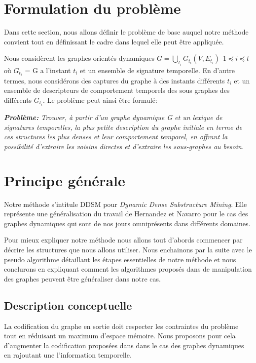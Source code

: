 \documentclass[a4paper,oneside,12pt]{report}
\theoremstyle{definition}
\begin{document}
		\section{Formulation du problème}
		Dans cette section, nous allons définir le problème de base auquel notre méthode convient tout en définissant le cadre dans lequel elle peut être appliquée. 
		
		Nous considèrent les graphes orientés dynamiques $\displaystyle{G=\bigcup_{t_{i}}G_{t_{i}}(V,E_{t_{i}})}\ \ 1 \preceq i \preceq t$ où $G_{t_{i}}$ = G a l'instant $t_{i}$ et un ensemble de signature temporelle. En d'autre termes, nous considérons des captures du graphe à des instants différents $t_{i}$ et un ensemble de descripteurs de comportement temporels des sous graphes des différents $G_{t_{i}}$. Le problème peut ainsi être formulé:
		
			\textit{\textbf{Problème:}
		Trouver, à partir d'un graphe dynamique G et un lexique de signatures temporelles, la plus petite description du graphe initiale en terme de ces structures les plus denses et leur comportement temporel, en offrant la possibilité d'extraire les voisins directes et d'extraire les sous-graphes au besoin. }

		\section{Principe générale}
			Notre méthode s'intitule DDSM pour \textit{Dynamic Dense Substructure Mining}. Elle représente une généralisation du travail de Hernandez et Navarro\citep{hernandez2014compressed} pour le cas des graphes dynamiques qui sont de nos jours omniprésents dans différents domaines.
			
			Pour mieux expliquer notre méthode nous allons tout d'abords commencer par décrire les structures que nous allons utiliser. Nous enchainons par la suite  avec le pseudo algorithme détaillant les étapes essentielles de notre méthode et nous conclurons en expliquant comment les algorithmes proposés dans \citep{hernandez2014compressed} de manipulation des graphes peuvent être généraliser dans notre cas.
			\subsection{Description conceptuelle}
			
			La codification du graphe en sortie doit respecter les contraintes du problème tout en réduisant un maximum d'espace mémoire. Nous proposons pour cela d'augmenter la codification proposées dans \citep{hernandez2014compressed} dans le cas des graphes dynamiques en rajoutant une l'information temporelle. 
			
\end{document}
